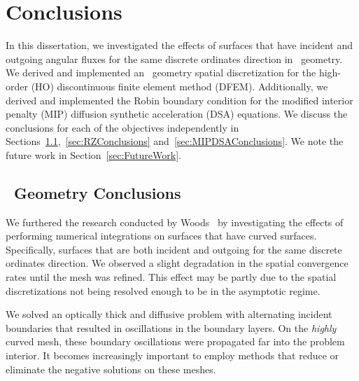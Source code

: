 \documentclass[12pt]{article}
\begin{document}
\section{Conclusions}
\label{sec:Conclusions}

In this dissertation, we investigated the effects of surfaces that have incident and outgoing angular fluxes for the same discrete ordinates direction in \XY\ geometry. We derived and implemented an \RZ\ geometry spatial discretization for the high-order (HO) discontinuous finite element method (DFEM). Additionally, we derived and implemented the Robin boundary condition for the modified interior penalty (MIP) diffusion synthetic acceleration (DSA) equations. We discuss the conclusions for each of the objectives independently in Sections~\ref{sec:XYConclusions},~\ref{sec:RZConclusions} and~\ref{sec:MIPDSAConclusions}. We note the future work in Section~\ref{sec:FutureWork}.

\subsection{\XY\ Geometry Conclusions}
\label{sec:XYConclusions}
We furthered the research conducted by Woods~\cite{WoodsThesis} by investigating the effects of performing numerical integrations on surfaces that have curved surfaces. Specifically, surfaces that are both incident and outgoing for the same discrete ordinates direction. We observed a slight degradation in the spatial convergence rates until the mesh was refined. This effect may be partly due to the spatial discretizations not being resolved enough to be in the asymptotic regime.

We solved an optically thick and diffusive problem with alternating incident boundaries that resulted in oscillations in the boundary layers. On the \emph{highly} curved mesh, these boundary oscillations were propagated far into the problem interior. It becomes increasingly important to employ methods that reduce or eliminate the negative solutions on these meshes. 

\end{document}
